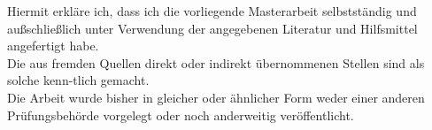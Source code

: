 


Hiermit erkläre ich, dass ich die vorliegende Masterarbeit selbstständig und außschließlich unter Verwendung der angegebenen Literatur und Hilfsmittel angefertigt habe.\\
Die aus fremden Quellen direkt oder indirekt übernommenen Stellen sind als solche kenn-tlich gemacht.\\

Die Arbeit wurde bisher in gleicher oder ähnlicher Form weder einer anderen Prüfungsbehörde vorgelegt oder noch anderweitig veröffentlicht.
\vspace{100pt}


\newpage